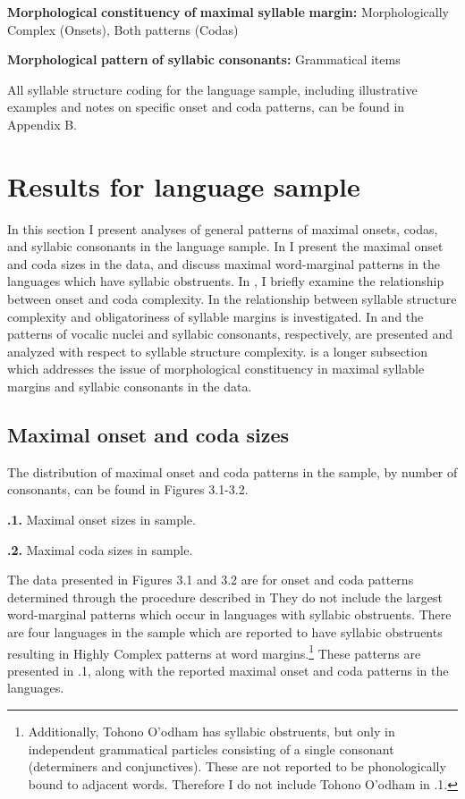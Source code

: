 \textbf{Morphological} \textbf{constituency} \textbf{of} \textbf{maximal} \textbf{syllable} \textbf{margin:} Morphologically Complex (Onsets), Both patterns (Codas)

\textbf{Morphological} \textbf{pattern} \textbf{of} \textbf{syllabic} \textbf{consonants:} Grammatical items

\z

  All syllable structure coding for the language sample, including illustrative examples and notes on specific onset and coda patterns, can be found in Appendix B.

\section{Results for language sample}\label{sec:3.3}

  In this section I present analyses of general patterns of maximal onsets, codas, and syllabic consonants in the language sample. In  I present the maximal onset and coda sizes in the data, and discuss maximal word-marginal patterns in the languages which have syllabic obstruents. In , I briefly examine the relationship between onset and coda complexity. In  the relationship between syllable structure complexity and obligatoriness of syllable margins is investigated. In  and  the patterns of vocalic nuclei and syllabic consonants, respectively, are presented and analyzed with respect to syllable structure complexity.  is a longer subsection which addresses the issue of morphological constituency in maximal syllable margins and syllabic consonants in the data.

\subsection{Maximal onset and coda sizes}\label{sec:3.3.1}

  The distribution of maximal onset and coda patterns in the sample, by number of consonants, can be found in Figures 3.1-3.2.

\textbf{.1.} Maximal onset sizes in sample.

\textbf{.2.} Maximal coda sizes in sample.

  The data presented in Figures 3.1 and 3.2 are for onset and coda patterns determined through the procedure described in  They do not include the largest word-marginal patterns which occur in languages with syllabic obstruents. There are four languages in the sample which are reported to have syllabic obstruents resulting in Highly Complex patterns at word margins.\footnote{ \textrm{Additionally, Tohono O’odham has syllabic obstruents, but only in independent grammatical particles consisting of a single consonant (determiners and conjunctives). These are not reported to be phonologically bound to adjacent words. Therefore I do not include Tohono O’odham in .1.}} These patterns are presented in .1, along with the reported maximal onset and coda patterns in the languages.

